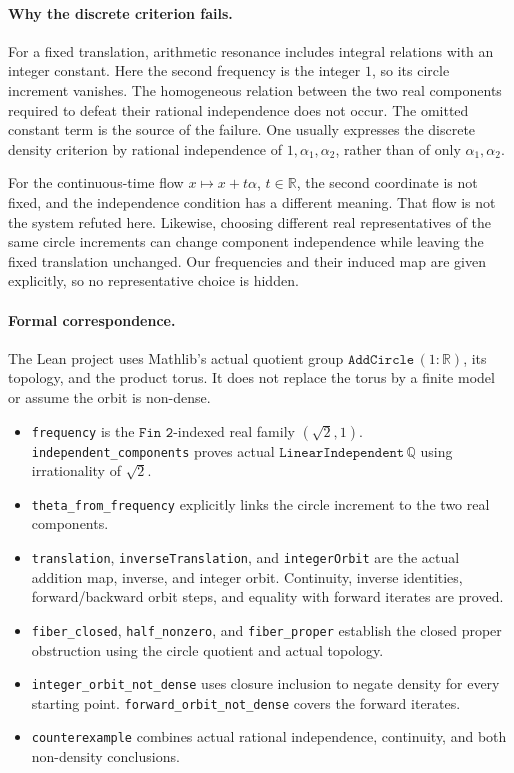 \documentclass[11pt]{article}
\begin{document}
\paragraph{Why the discrete criterion fails.}
For a fixed translation, arithmetic resonance includes integral relations with an integer constant. Here the second frequency is the integer \(1\), so its circle increment vanishes. The homogeneous relation between the two real components required to defeat their rational independence does not occur. The omitted constant term is the source of the failure. One usually expresses the discrete density criterion by rational independence of \(1,\alpha_1,\alpha_2\), rather than of only \(\alpha_1,\alpha_2\).

For the continuous-time flow \(x\mapsto x+t\alpha\), \(t\in\mathbb R\), the second coordinate is not fixed, and the independence condition has a different meaning. That flow is not the system refuted here. Likewise, choosing different real representatives of the same circle increments can change component independence while leaving the fixed translation unchanged. Our frequencies and their induced map are given explicitly, so no representative choice is hidden.

\paragraph{Formal correspondence.}
The Lean project uses Mathlib's actual quotient group
\(\texttt{AddCircle}\,(1:\mathbb R)\), its topology, and the product torus. It does not replace the torus by a finite model or assume the orbit is non-dense.
\begin{itemize}
\item \texttt{frequency} is the \(\texttt{Fin 2}\)-indexed real family \((\sqrt2,1)\). \texttt{independent\_components} proves actual \(\texttt{LinearIndependent}\,\mathbb Q\) using irrationality of \(\sqrt2\).
\item \texttt{theta\_from\_frequency} explicitly links the circle increment to the two real components.
\item \texttt{translation}, \texttt{inverseTranslation}, and \texttt{integerOrbit} are the actual addition map, inverse, and integer orbit. Continuity, inverse identities, forward/backward orbit steps, and equality with forward iterates are proved.
\item \texttt{fiber\_closed}, \texttt{half\_nonzero}, and \texttt{fiber\_proper} establish the closed proper obstruction using the circle quotient and actual topology.
\item \texttt{integer\_orbit\_not\_dense} uses closure inclusion to negate density for every starting point. \texttt{forward\_orbit\_not\_dense} covers the forward iterates.
\item \texttt{counterexample} combines actual rational independence, continuity, and both non-density conclusions.
\end{itemize}
\end{document}
